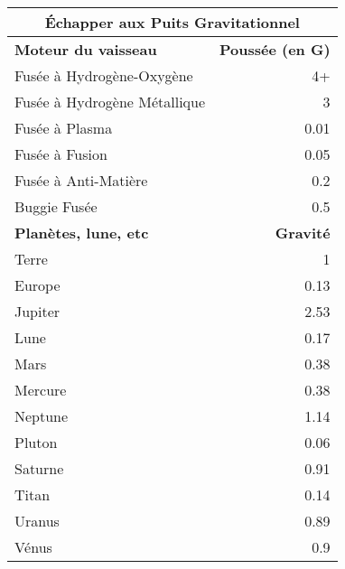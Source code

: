 \begin{table} \begin{tabular}{|l|r} \hline

\multicolumn{2}{|c|}{\textbf{Échapper aux Puits Gravitationnel}} \\ \hline

\textbf{Moteur du vaisseau}	&\textbf{Poussée (en G)} \\ \hline

Fusée à Hydrogène-Oxygène	&4+ \\ \hline

Fusée à Hydrogène Métallique	&3 \\ \hline

Fusée à Plasma	&0.01 \\ \hline

Fusée à Fusion	&0.05 \\ \hline

Fusée à Anti-Matière	&0.2 \\ \hline

Buggie Fusée	&0.5 \\ \hline

\textbf{Planètes, lune, etc}	&\textbf{Gravité} \\ \hline

Terre	&1 \\ \hline

Europe	&0.13 \\ \hline

Jupiter	&2.53 \\ \hline

Lune	&0.17 \\ \hline

Mars	&0.38 \\ \hline

Mercure	&0.38 \\ \hline

Neptune	&1.14 \\ \hline

Pluton	&0.06 \\ \hline

Saturne	&0.91 \\ \hline

Titan	&0.14 \\ \hline

Uranus	&0.89 \\ \hline

Vénus	&0.9 \\ \hline

\end{tabular} \label{tab:excaping-gravity} \end{table} 

